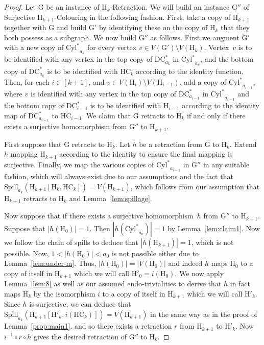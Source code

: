 \documentclass[a4paper,12pt]{article}
\theoremstyle{remark}
\newcommand{\HC}[0]{\ensuremath{\mathrm{HC}}}
\newcommand{\DC}[0]{\ensuremath{\mathrm{DC}}}
\newcommand{\Cyl}[0]{\ensuremath{\mathrm{Cyl}^*}}
\newcommand{\G}{\ensuremath{\mathrm{G}}}
\renewcommand{\H}{\ensuremath{\mathrm{H}}}
\begin{document}
\begin{proof}
Let $\G$ be an instance of {\sc $\H_k$-Retraction}.
We will build an instance $\G''$ of {\sc Surjective $\H_{k+1}$-Colouring} in the following fashion. First, take a copy of $\H_{k+1}$ together with $\G$ and build $\G'$ by identifying these on the copy of $\H_{k}$ that they both possess as a subgraph.
We now build $\G''$ as follows. 
First we augment $\G'$ with a new copy of $\Cyl_{a_k}$ for every vertex $v\in V(\G')\setminus V(\H_k)$. Vertex~$v$ is to be identified with any vertex in the top copy of 
$\DC^*_{a_k}$ in $\Cyl_{a_k}$, and the bottom copy of $\DC^*_{a_k}$ is to be identified with $\HC_k$ according to the identity function.
Then, for each $i \in [k+1]$, and $v \in V(\H_{i}) \setminus V(\H_{i-1})$, add a copy of $\Cyl_{a_{i-1}}$, where $v$ is identified with any vertex in the top copy of $\DC^*_{a_{i-1}}$ in $\Cyl_{a_{i-1}}$ and the bottom copy of $\DC^*_{i-1}$ is to be identified with $\H_{i-1}$ according to the identity map of $\DC^*_{a_{i-1}}$ to $\HC_{i-1}$.
We claim that $\G$ retracts to $\H_k$ if and only if there exists a surjective homomorphism from $\G''$ to $\H_{k+1}$.

First suppose that $\G$ retracts to $\H_k$.
Let $h$ be a retraction from $\G$ to $\H_{k}$. Extend $h$ mapping $\H_{k+1}$ according to the identity to ensure the final mapping is surjective. Finally, we map the various copies of $\Cyl_{a_{i-1}}$ in $\G''$ in any suitable fashion, which will always exist due to our assumptions and the fact that $\mathrm{Spill}_{a_{k}}(\H_{k+1}[\H_{k},\HC_{k}]) = V(\H_{k+1})$, which follows from our assumption that $\H_{k+1}$ retracts to $\H_k$ and Lemma~\ref{lem:spillage}.

Now suppose that if there exists a surjective homomorphism~$h$ from $\G''$ to $\H_{k+1}$.
Suppose that $|h(\H_0)|=1$. Then 
$|h(\Cyl_{a_0})|=1$
 by Lemma~\ref{lem:claim1}. Now we follow the chain of spills to deduce that $|h(\H_{k+1})|=1$, which is not possible.
Now, $1<|h(\H_0)|<a_0$ is not possible either due to Lemma~\ref{lem:under-m}. 
Thus, $|h(\H_0)|=|V(\H_0)|$ and indeed $h$ maps $\H_0$ to a copy of itself in $\H_{k+1}$ which we will call $\H'_0=i(\H_0)$. We now apply Lemma~\ref{lem:8} as well as our assumed endo-trivialities to derive that $h$ in fact maps $\H_k$ by the isomorphism $i$ to a copy of itself in $\H_{k+1}$ which we will call $\H'_{k}$. Since $h$ is surjective, we can deduce that $\mathrm{Spill}_{a_k}(\H_{k+1}[\H'_k,i(\HC_{k})]) = V(\H_{k+1})$
in the same way as in the proof of Lemma~\ref{prop:main1}.
 and so there exists a retraction $r$ from $\H_{k+1}$ to $\H'_k$.  Now $i^{-1} \circ r \circ h$ gives the desired retraction of $\G''$ to $\H_k$.   
\end{proof}
\end{document}
